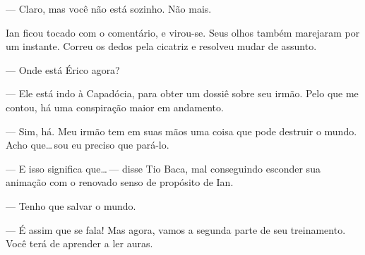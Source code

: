 --- Claro, mas você não está sozinho. Não mais.

Ian ficou tocado com o comentário, e virou-se. Seus olhos também
marejaram por um instante. Correu os dedos pela cicatriz e resolveu
mudar de assunto.

--- Onde está Érico agora?

--- Ele está indo à Capadócia, para obter um dossiê sobre seu irmão.
Pelo que me contou, há uma conspiração maior em andamento.

--- Sim, há. Meu irmão tem em suas mãos uma coisa que pode destruir o
mundo. Acho que\ldots\,sou eu preciso que pará-lo.

--- E isso significa que\ldots\,--- disse Tio Baca, mal conseguindo
esconder sua animação com o renovado senso de propósito de Ian.

--- Tenho que salvar o mundo.

--- É assim que se fala! Mas agora, vamos a segunda parte de seu
treinamento. Você terá de aprender a ler auras.
